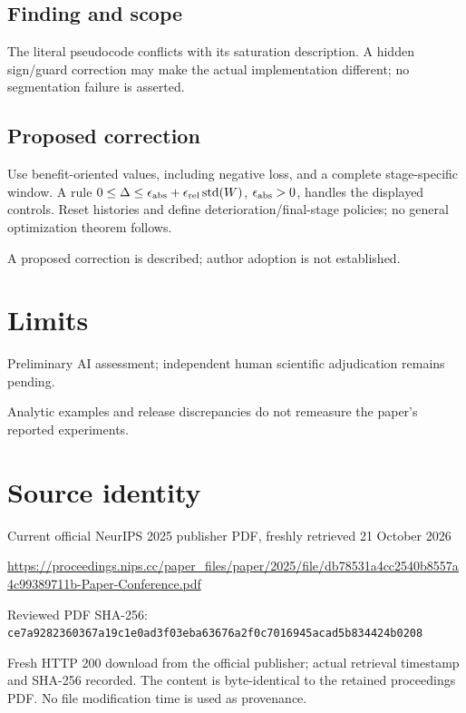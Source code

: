 \documentclass[11pt]{article}
\begin{document}
\subsection*{Finding and scope}

The literal pseudocode conflicts with its saturation description. A hidden sign/guard correction may make the actual implementation different; no segmentation failure is asserted.

\subsection*{Proposed correction}

Use benefit-oriented values, including negative loss, and a complete stage-specific window. A rule \(0\le\Delta\le\epsilon_{\rm abs}+\epsilon_{\rm rel}\operatorname{std}(W)\), \(\epsilon_{\rm abs}>0\), handles the displayed controls. Reset histories and define deterioration/final-stage policies; no general optimization theorem follows.

A proposed correction is described; author adoption is not established.

\section*{Limits}

Preliminary AI assessment; independent human scientific adjudication remains pending.\par

Analytic examples and release discrepancies do not remeasure the paper’s reported experiments.\par

\section*{Source identity}

Current official NeurIPS 2025 publisher PDF, freshly retrieved 21 October 2026

\url{https://proceedings.nips.cc/paper_files/paper/2025/file/db78531a4cc2540b8557a4c99389711b-Paper-Conference.pdf}

Reviewed PDF SHA-256: \nolinkurl{ce7a9282360367a19c1e0ad3f03eba63676a2f0c7016945acad5b834424b0208}

Fresh HTTP 200 download from the official publisher; actual retrieval timestamp and SHA-256 recorded. The content is byte-identical to the retained proceedings PDF. No file modification time is used as provenance.
\end{document}
